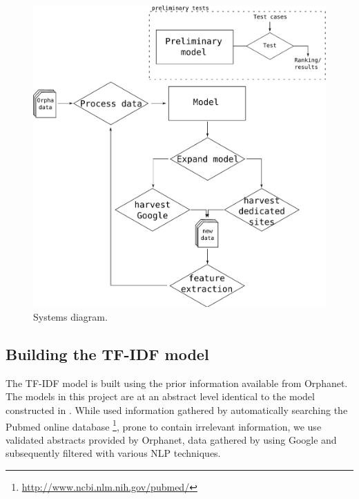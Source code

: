 \documentclass[10pt,letterpaper,two column,final]{article}
\begin{document}
\begin{figure}[htp!]
\begin{center}
\includegraphics[scale=0.4]{images/pipeline}
\caption{Systems diagram.}
\label{fig:flow}
\end{center}
\end{figure}



\subsection{Building the TF-IDF model}
\label{chap:basicmodel}
The TF-IDF model is built using the prior information available
from Orphanet. The models in this project are at an abstract level
identical to the model constructed in \cite{jensenandersen}. While
\cite{jensenandersen} used information gathered by automatically
searching the Pubmed online database
\footnote{\url{http://www.ncbi.nlm.nih.gov/pubmed/}}, prone to contain
irrelevant information, we use validated abstracts provided by Orphanet,
data gathered by using Google and subsequently filtered with various
NLP techniques.
\end{document}
